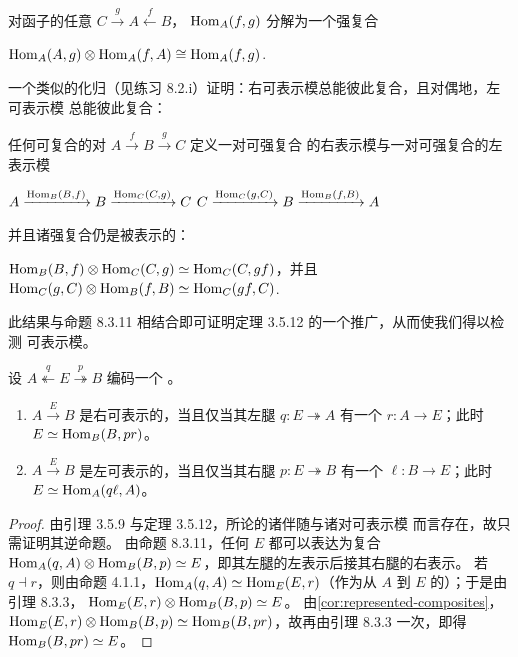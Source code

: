 \begin{corollary}\label{cor:comma-module-factors}
对函子的任意\trCospan{} $C\xrightarrow{g}A\xleftarrow{f}B$，\trCommaModule{} $\mathrm{Hom}_{A}(f,g)$
分解为一个强复合
\begin{center}
$\mathrm{Hom}_{A}(A,g)\otimes\mathrm{Hom}_{A}(f,A)\cong\mathrm{Hom}_{A}(f,g)$.
\end{center}
\end{corollary}

一个类似的化归（见练习 8.2.i）证明：右可表示模总能彼此复合，且对偶地，左可表示模
总能彼此复合：

\begin{corollary}\label{cor:represented-composites}
任何可复合的\trFunctor{}对 $A\xrightarrow{f}B\xrightarrow{g}C$ 定义一对可强复合
的右表示模与一对可强复合的左表示模
\begin{center}
$A\xrightarrow{\mathrm{Hom}_{B}(B,f)}B\xrightarrow{\mathrm{Hom}_{C}(C,g)}C$
\qquad\qquad
$C\xrightarrow{\mathrm{Hom}_{C}(g,C)}B\xrightarrow{\mathrm{Hom}_{B}(f,B)}A$
\end{center}
并且诸强复合仍是被表示的：
\begin{center}
$\mathrm{Hom}_{B}(B,f)\otimes\mathrm{Hom}_{C}(C,g)\simeq\mathrm{Hom}_{C}(C,gf)$，并且\\[0.3em]
$\mathrm{Hom}_{C}(g,C)\otimes\mathrm{Hom}_{B}(f,B)\simeq\mathrm{Hom}_{C}(gf,C)$.
\end{center}
\end{corollary}

此结果与命题 8.3.11 相结合即可证明定理 3.5.12 的一个推广，从而使我们得以检测
可表示模。

\begin{proposition}\label{prop:detect-representable-modules}
设 $A\overset{q}{\twoheadleftarrow}E\overset{p}{\twoheadrightarrow}B$ 编码一个%
\trModule{}。
\begin{enumerate}[label=(\roman*)]
\item \trModule{} $A\xrightarrow{E}B$ 是右可表示的，当且仅当其左腿
$q\colon E\twoheadrightarrow A$ 有一个\trRightAdjoint{} $r\colon A\to E$；此时
$E\simeq\mathrm{Hom}_{B}(B,pr)$。
\item \trModule{} $A\xrightarrow{E}B$ 是左可表示的，当且仅当其右腿
$p\colon E\twoheadrightarrow B$ 有一个\trLeftAdjoint{} $\ell\colon B\to E$；此时
$E\simeq\mathrm{Hom}_{A}(q\ell,A)$。
\end{enumerate}
\end{proposition}

\begin{proof}
由引理 3.5.9 与定理 3.5.12，所论的诸伴随与诸\trFiberedEquivalence{}对可表示模
而言存在，故只需证明其逆命题。
由命题 8.3.11，任何\trModule{} $E$ 都可以表达为复合
$\mathrm{Hom}_{A}(q,A)\otimes\mathrm{Hom}_{B}(B,p)\simeq E$，即其左腿的左表示后接其右腿的右表示。
若 $q\dashv r$，则由命题 4.1.1，$\mathrm{Hom}_{A}(q,A)\simeq\mathrm{Hom}_{E}(E,r)$（作为从 $A$ 到 $E$
的\trModule）；于是由引理 8.3.3，
$\mathrm{Hom}_{E}(E,r)\otimes\mathrm{Hom}_{B}(B,p)\simeq E$。
由\cref{cor:represented-composites}，
$\mathrm{Hom}_{E}(E,r)\otimes\mathrm{Hom}_{B}(B,p)\simeq\mathrm{Hom}_{B}(B,pr)$，故再由引理 8.3.3 一次，即得
$\mathrm{Hom}_{B}(B,pr)\simeq E$。
\end{proof}

